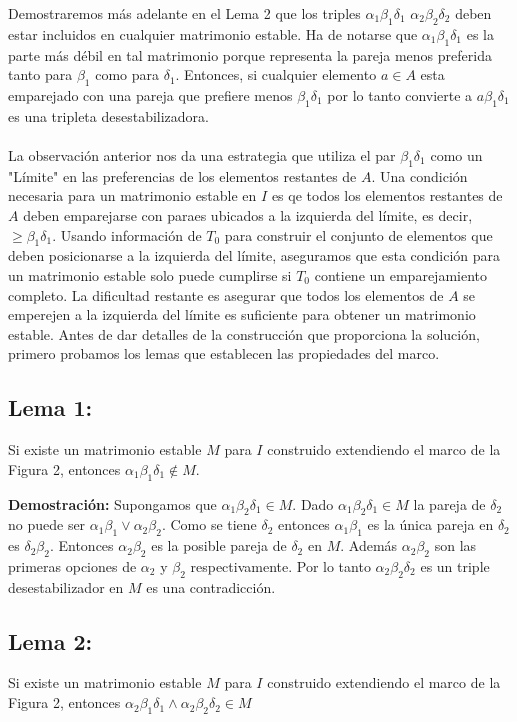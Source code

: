\documentclass{article}
\begin{document}
Demostraremos más adelante en el Lema 2 que los triples $\alpha_1 \beta_1 \delta_1$  $\alpha_2 \beta_2 \delta_2$
deben estar incluidos en cualquier matrimonio estable. Ha de notarse que $\alpha_1 \beta_1 \delta_1$ es la parte más débil en tal matrimonio
porque representa la pareja menos preferida tanto para $\beta_1$ como para $\delta_1$. Entonces, si cualquier elemento $a \in A$ esta emparejado con una pareja
que prefiere menos $\beta_1 \delta_1$ por lo tanto convierte a $a\beta_1\delta_1$ es una tripleta desestabilizadora.
\\
\\
La observación anterior nos da una estrategia que utiliza el par $\beta_1 \delta_1$ como un "Límite" en las preferencias de los elementos restantes de $A$.
Una condición necesaria para un matrimonio estable en $I$ es qe todos los elementos restantes de $A$ deben emparejarse con paraes ubicados a la izquierda del límite, es decir, $\geq \beta_1 \delta_1$. Usando información de $T_0$ para construir el conjunto de elementos que deben posicionarse 
a la izquierda del límite, aseguramos que esta condición para un matrimonio estable solo puede cumplirse si $T_0$ contiene un emparejamiento completo.
La dificultad restante es asegurar que todos los elementos de $A$ se emperejen a la izquierda del límite es suficiente para obtener un matrimonio estable. Antes de dar detalles de la construcción que proporciona la solución, primero probamos los lemas que establecen las propiedades del marco.

\subsection{Lema 1:}
Si existe un matrimonio estable $M$ para $I$ construido extendiendo el marco de la Figura 2, entonces $\alpha_1 \beta_1 \delta_1 \notin M $.

\textbf{Demostración: }Supongamos que $\alpha_1 \beta_2 \delta_1 \in M$. Dado $\alpha_1 \beta_2 \delta_1 \in M$ la pareja de $\delta_2$ no puede ser $\alpha_1 \beta_1 \lor  \alpha_2 \beta_2$.
Como se tiene $\delta_2$ entonces $\alpha_1 \beta_1$ es la única pareja en $\delta_2$ es $\delta_2 \beta_2$.
Entonces $\alpha_2 \beta_2$ es la posible pareja de $\delta_2$ en $M$. Además $\alpha_2 \beta_2$ son las primeras opciones de $\alpha_2$ y $\beta_2$ respectivamente. Por lo tanto $\alpha_2 \beta_2 \delta_2$ es un triple desestabilizador en $M$ es una contradicción.

\subsection{Lema 2:}
Si existe un matrimonio estable $M$ para $I$ construido extendiendo el marco de la Figura 2, entonces $\alpha_2 \beta_1 \delta_1 \land \alpha_2 \beta_2 \delta_2  \in M$ 
\end{document}
